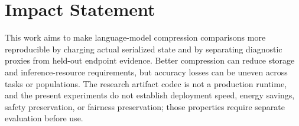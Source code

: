 \documentclass{article}
\theoremstyle{plain}
\theoremstyle{remark}
\begin{document}
\FloatBarrier
\section*{Impact Statement}
This work aims to make language-model compression comparisons more reproducible by charging actual serialized state and by separating diagnostic proxies from held-out endpoint evidence.  Better compression can reduce storage and inference-resource requirements, but accuracy losses can be uneven across tasks or populations.  The research artifact codec is not a production runtime, and the present experiments do not establish deployment speed, energy savings, safety preservation, or fairness preservation; those properties require separate evaluation before use.

\clearpage



\clearpage
\appendix


\end{document}
